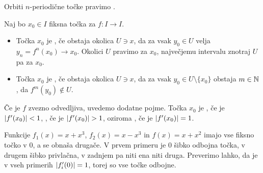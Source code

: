 \begin{definicija}
  Orbiti $n$-periodične točke pravimo .
\end{definicija}

\begin{definicija}
  Naj bo $x_0 \in I$ fiksna točka za $f: I \to I$.
  \begin{itemize}
  \item Točka $x_0$ je , če obstaja okolica $U \ni x$, da
	za vsak $y_0 \in U$ velja $y_n = f^n(x_0) \to x_0$.
	Okolici $U$ pravimo  za $x_0$, največjemu intervalu
	znotraj $U$ pa  za $x_0$.
  \item Točka $x_0$ je , če obstaja okolica $U \ni x$, da
	za vsak $y_0 \in U \setminus \{x_0\}$ obstaja $m \in \mathbb{N}$, da $f^m(y_0)
	\notin U$.
  \end{itemize}
\end{definicija}

\begin{definicija}
  Če je $f$ zvezno odvedljiva, uvedemo dodatne pojme. Točka $x_0$ je
  , če je $\left| f'(x_0) \right| < 1$, , če je
  $\left| f'(x_0) \right| > 1$, oziroma , če je $\left| f'(x_0) \right| = 1$.
\end{definicija}

\begin{primer}
  Funkcije $f_1(x) = x+x^3$, $f_2(x) = x - x^3$ in $f(x) = x + x^2$ imajo vse
  fiksno točko v $0$, a se obnaša drugače.
  V prvem primeru je $0$ šibko odbojna točka, v drugem šibko privlačna, v zadnjem pa
  niti ena niti druga.
  Preverimo lahko, da je v vseh primerih $\left| f_i'(0) \right| = 1$, torej so vse točke
  odbojne.
\end{primer}

